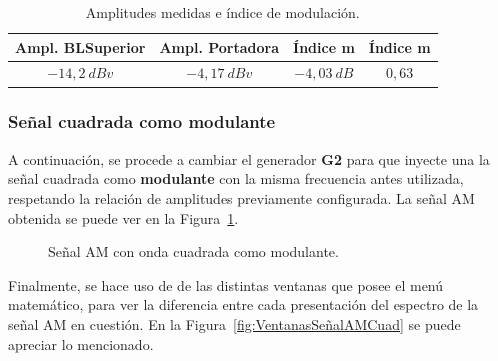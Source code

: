       \begin{table}[H]
        \centering
      \begin{tabular}{cccc} \hline \hline
          \textbf{Ampl. BLSuperior}    &   \textbf{Ampl. Portadora}  &  \textbf{Índice m}  & \textbf{Índice m}  \\ \hline
          $-14,2~dBv$   &   $-4,17~dBv$   &    $-4,03~dB$   &   $0,63$   \\ \hline \hline
        \end{tabular}
        \caption{Amplitudes medidas e índice de modulación.}
        \label{tab:MedicionesAmplitAMSeno}
      \end{table}


    \subsubsection{Señal cuadrada como modulante}
      A continuación, se procede a cambiar el generador \textbf{G2} para que inyecte una la señal cuadrada
      como \textbf{modulante} con la misma frecuencia antes utilizada, respetando la relación de amplitudes
      previamente configurada. La señal AM obtenida se puede ver en la Figura~\ref{fig:SeñalAMConCuadrada}.

      \begin{figure}[H]
        \centering
        \caption{Señal AM con onda cuadrada como modulante.}
        \label{fig:SeñalAMConCuadrada}
      \end{figure}

      Finalmente, se hace uso de de las distintas ventanas que posee el menú matemático, para ver la diferencia
      entre cada presentación del espectro de la señal AM en cuestión. En la Figura~\ref{fig:VentanasSeñalAMCuad}
      se puede apreciar lo mencionado.

